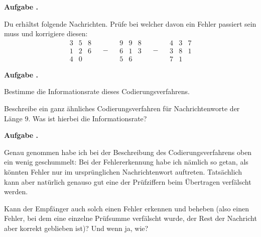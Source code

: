 \documentclass[a4paper,ngerman,12pt]{scrartcl}
\theoremstyle{definition}
\theoremstyle{plain}
\theoremstyle{remark}
\newlength{\aufgabenskip}
\newcounter{aufgabennummer}
\newenvironment{aufgabe}[1]{
	\addtocounter{aufgabennummer}{1}
	\textbf{Aufgabe \theaufgabennummer.} \emph{#1} \par
}{\vspace{\aufgabenskip}}
\begin{document}
\begin{aufgabe}{}
	Du erhältst folgende Nachrichten. Prüfe bei welcher davon ein Fehler passiert sein muss und korrigiere diesen:
		\[\begin{array}{ccc}3 & 5 & 8\\1 & 2 & 6 \\ 4 & 0 &\end{array} \quad-\quad \begin{array}{ccc}9 & 9 & 8\\6 & 1 & 3 \\ 5 & 6 &\end{array} \quad-\quad \begin{array}{ccc}4 & 3 & 7\\3 & 8 & 1 \\ 7 & 1 &\end{array}\]
\end{aufgabe}

\begin{aufgabe}{}
	Bestimme die Informationsrate dieses Codierungsverfahrens.
	
	Beschreibe ein ganz ähnliches Codierungsverfahren für Nachrichtenworte der Länge $9$. Was ist hierbei die Informationsrate?
\end{aufgabe}

\begin{aufgabe}{}
	Genau genommen habe ich bei der Beschreibung des Codierungsverfahrens oben ein wenig geschummelt: Bei der Fehlererkennung habe ich nämlich so getan, als könnten Fehler nur im ursprünglichen Nachrichtenwort auftreten. Tatsächlich kann aber natürlich genauso gut eine der Prüfziffern beim Übertragen verfälscht werden. 
	
	Kann der Empfänger auch solch einen Fehler erkennen und beheben (also einen Fehler, bei dem eine einzelne Prüfsumme verfälscht wurde, der Rest der Nachricht aber korrekt geblieben ist)? Und wenn ja, wie?
\end{aufgabe}
\end{document}
